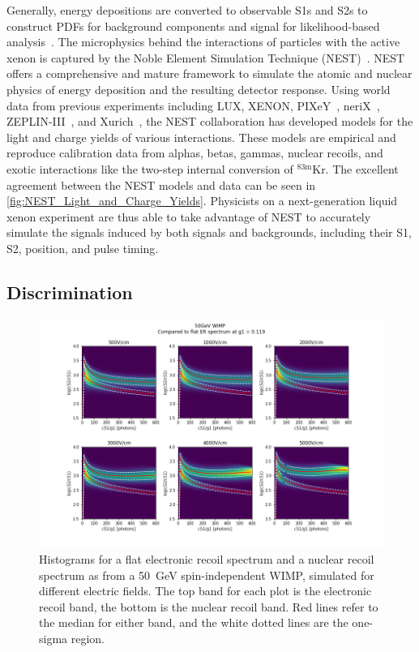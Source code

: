 Generally, energy depositions are converted to observable S1s and S2s to construct PDFs for background components and signal for likelihood-based analysis~\cite{Aprile:2011hx}. The microphysics behind the interactions of particles with the active xenon is captured by the Noble Element Simulation Technique (NEST)~\cite{Szydagis:2011tk, Szydagis:2013sih, Mock:2013ila, Lenardo:2014cva, szydagis_m_2020_3905382}. NEST offers a comprehensive and mature framework to simulate the atomic and nuclear physics of energy deposition and the resulting detector response. Using world data from previous experiments including LUX, XENON, PIXeY~\cite{Singh:2019nrd,Bodnia:2021flk}, neriX~\cite{Plante:2011hw,Goetzke:2016lfg}, ZEPLIN-III~\cite{Araujo:2020rwg}, and Xurich~\cite{Baudis:2017xov,Baudis:2020nwe}, the NEST collaboration has developed models for the light and charge yields of various interactions. These models are empirical and reproduce calibration data from alphas, betas, gammas, nuclear recoils, and exotic interactions like the two-step internal conversion of $^{\text{83m}}$Kr. The excellent agreement between the NEST models and data can be seen in \autoref{fig:NEST_Light_and_Charge_Yields}. Physicists on a next-generation liquid xenon experiment are thus able to take advantage of NEST to accurately simulate the signals induced by both signals and backgrounds, including their S1, S2, position, and pulse timing. 

\subsection{Discrimination}

\begin{figure}[!htbp]
\begin{center}
\includegraphics[width=0.99\columnwidth,clip,trim=70 40 70 50]{fig_wimperhistos.png}
\caption{Histograms for a flat electronic recoil spectrum and a nuclear recoil spectrum as from a 50~GeV spin-independent WIMP, simulated for different electric fields. The top band for each plot is the electronic recoil band, the bottom is the nuclear recoil band. Red lines refer to the median for either band, and the white dotted lines are the one-sigma region.}\label{fig:wimperhistos}
\end{center}
\end{figure}

